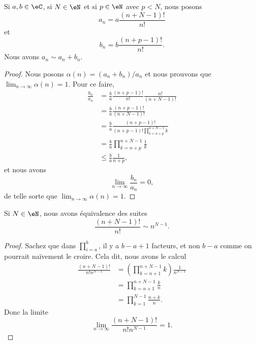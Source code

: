 \begin{lemma}       \label{LEMooVMLEooCzPuKy}
    Si \( a,b\in \eC\), si \( N\in \eN\) et si \( p\in \eN\) avec \( p<N\), nous posons
    \begin{equation}
        a_n=a\frac{ (n+N-1)! }{ n! }
    \end{equation}
    et 
    \begin{equation}
        b_n=b\frac{ (n+p-1)! }{ n! }.
    \end{equation}
    Nous avons \( a_n\sim a_n+b_n\).
\end{lemma}

\begin{proof}
    Nous posons \( \alpha(n)=(a_n+b_n)/a_n\) et nous prouvons que \( \lim_{n\to \infty} \alpha(n)=1\). Pour ce faire,
    \begin{subequations}
        \begin{align}
        \frac{ b_n }{ a_n }&=\frac{ b }{ a }\frac{ (n+p-1)! }{ n! }\frac{ n! }{ (n+N-1)! }\\
        &=\frac{ b }{ a }\frac{ (n+p-1)! }{ (n+N-1)! }\\
        &=\frac{ b }{ a }\frac{ (n+p-1)! }{ (n+p-1)!\prod_{k=n+p}^{n+N-1}k }\\
        &=\frac{ b }{ a }\prod_{k=n+p}^{n+N-1}\frac{1}{ k }\\
        &\leq \frac{ b }{ a }\frac{1}{ n+p },
        \end{align}
    \end{subequations}
    et nous avons
    \begin{equation}
        \lim_{n\to \infty} \frac{ b_n }{ a_n }=0, 
    \end{equation}
    de telle sorte que \( \lim_{n\to \infty} \alpha(n)=1\).
\end{proof}

\begin{lemma}       \label{LEMooTGHHooZHZsgE}
    Si \( N\in \eN\), nous avons équivalence des suites
    \begin{equation}
        \frac{ (n+N-1)! }{ n! }\sim n^{N-1}.
    \end{equation}
\end{lemma}

\begin{proof}
    Sachez que dans \( \prod_{i=a}^b\), il y a \( b-a+1\) facteurs, et non \( b-a\) comme on pourrait naïvement le croire. Cela dit, nous avons le calcul
    \begin{subequations}
        \begin{align}
            \frac{ (n+N-1)! }{ n!n^{N-1} }&=\left( \prod_{k=n+1}^{n+N-1}k \right)\frac{1}{ n^{N-1} }\\
            &=\prod_{k=n+1}^{n+N-1}\frac{ k }{ n }\\
            &=\prod_{k=1}^{N-1}\frac{ n+k }{ n }.
        \end{align}
    \end{subequations}
    Donc la limite
    \begin{equation}
        \lim_{n\to \infty} \frac{ (n+N-1)! }{ n!n^{N-1} }=1.
    \end{equation}
\end{proof}

